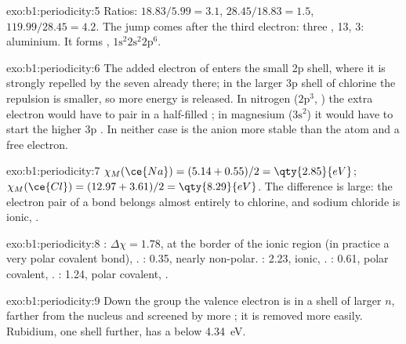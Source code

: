 \begin{solution}{exo:b1:periodicity:5}
Ratios: $18.83/5.99 = 3.1$, $28.45/18.83 = 1.5$, $119.99/28.45 = 4.2$. The
jump comes after the third electron: three ,  13,
 3: aluminium. It forms , $1\text{s}^2 2\text{s}^2
2\text{p}^6$.
\end{solution}

\begin{solution}{exo:b1:periodicity:6}
The added electron of  enters the small 2p shell, where it is
strongly repelled by the seven  already there; in the
larger 3p shell of chlorine the repulsion is smaller, so more energy is
released. In nitrogen ($2\text{p}^3$, ) the extra electron
would have to pair in a half-filled ; in magnesium ($3\text{s}^2$)
it would have to start the higher 3p . In neither case is the
anion more stable than the atom and a free electron.
\end{solution}

\begin{solution}{exo:b1:periodicity:7}
$\chi_M(\ce{Na}) = (5.14 + 0.55)/2 = \qty{2.85}{eV}$; $\chi_M(\ce{Cl}) =
(12.97 + 3.61)/2 = \qty{8.29}{eV}$. The difference is large: the electron
pair of a  bond belongs almost entirely to chlorine, and sodium
chloride is ionic, .
\end{solution}

\begin{solution}{exo:b1:periodicity:8}
: $\Delta\chi = 1.78$, at the border of the ionic region (in
practice a very polar covalent bond), . : 0.35,
nearly non-polar. : 2.23, ionic, . : 0.61,
polar covalent, . : 1.24, polar
covalent, .
\end{solution}

\begin{solution}{exo:b1:periodicity:9}
Down the group the valence electron is in a shell of larger $n$, farther
from the nucleus and screened by more ; it is removed more
easily. Rubidium, one shell further, has a  below
\qty{4.34}{eV}.
\end{solution}


